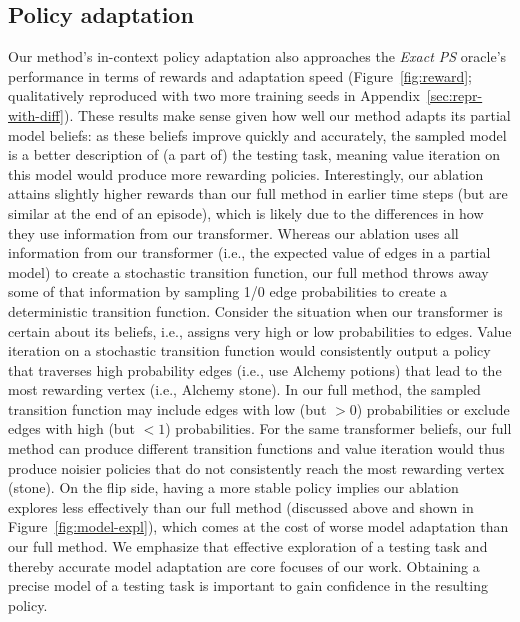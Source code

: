 \documentclass[sigconf]{aamas}
\begin{document}
\subsection{Policy adaptation}
Our method's in-context policy adaptation also approaches the \textit{Exact PS} oracle's performance in terms of rewards and adaptation speed (Figure~\ref{fig:reward}; qualitatively reproduced with two more training seeds in Appendix~\ref{sec:repr-with-diff}). These results make sense given how well our method adapts its partial model beliefs: as these beliefs improve quickly and accurately, the sampled model is a better description of (a part of) the testing task, meaning value iteration on this model would produce more rewarding policies. Interestingly, our ablation attains slightly higher rewards than our full method in earlier time steps (but are similar at the end of an episode), which is likely due to the differences in how they use information from our transformer.
Whereas our ablation uses all information from our transformer (i.e., the expected value of edges in a partial model) to create a stochastic transition function, our full method throws away some of that information by sampling 1/0 edge probabilities to create a deterministic transition function. Consider the situation when our transformer is certain about its beliefs, i.e., assigns very high or low probabilities to edges. Value iteration on a stochastic transition function would consistently output a policy that traverses high probability edges (i.e., use Alchemy potions) that lead to the most rewarding vertex (i.e., Alchemy stone). In our full method, the sampled transition function may include edges with low (but $>0$) probabilities or exclude edges with high (but $<1$) probabilities. For the same transformer beliefs, our full method can produce different transition functions and value iteration would thus produce noisier policies that do not consistently reach the most rewarding vertex (stone).
On the flip side, having a more stable policy implies our ablation explores less effectively than our full method (discussed above and shown in Figure~\ref{fig:model-expl}), which comes at the cost of worse model adaptation than our full method. We emphasize that effective exploration of a testing task and thereby accurate model adaptation are core focuses of our work. Obtaining a precise model of a testing task is important to gain confidence in the resulting policy.
\end{document}
